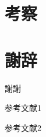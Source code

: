 \documentclass[11pt,a4j]{jreport}
\begin{document}
  \newpage




  \chapter{考察}

  \newpage




  \chapter*{謝辞} %
  謝謝

  \newpage


  
  
  \renewcommand{\bibname}{参考文献} %
  \begin{thebibliography}{99}
      参考文献1

      参考文献2
  \end{thebibliography}
\end{document}
